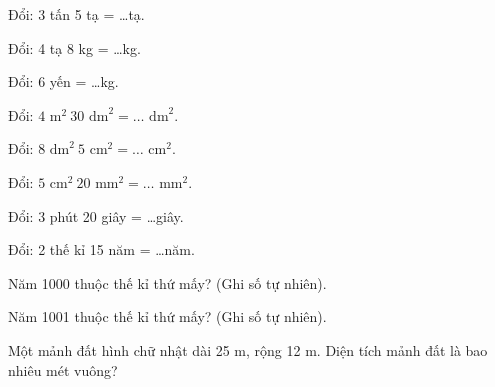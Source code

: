 \begin{ex}
Đổi: 3 tấn 5 tạ = \dots tạ.
\end{ex}

\begin{ex}
Đổi: 4 tạ 8 kg = \dots kg.
\end{ex}

\begin{ex}
Đổi: 6 yến = \dots kg.
\end{ex}

\begin{ex}
Đổi: $4\text{ m}^2\ 30\text{ dm}^2 = \dots\text{ dm}^2$.
\end{ex}

\begin{ex}
Đổi: $8\text{ dm}^2\ 5\text{ cm}^2 = \dots\text{ cm}^2$.
\end{ex}

\begin{ex}
Đổi: $5\text{ cm}^2\ 20\text{ mm}^2 = \dots\text{ mm}^2$.
\end{ex}

\begin{ex}
Đổi: 3 phút 20 giây = \dots giây.
\end{ex}

\begin{ex}
Đổi: 2 thế kỉ 15 năm = \dots năm.
\end{ex}

\begin{ex}
Năm 1000 thuộc thế kỉ thứ mấy? (Ghi số tự nhiên).
\end{ex}

\begin{ex}
Năm 1001 thuộc thế kỉ thứ mấy? (Ghi số tự nhiên).
\end{ex}

\begin{ex}
Một mảnh đất hình chữ nhật dài 25 m, rộng 12 m. Diện tích mảnh đất là bao nhiêu mét vuông?
\end{ex}

